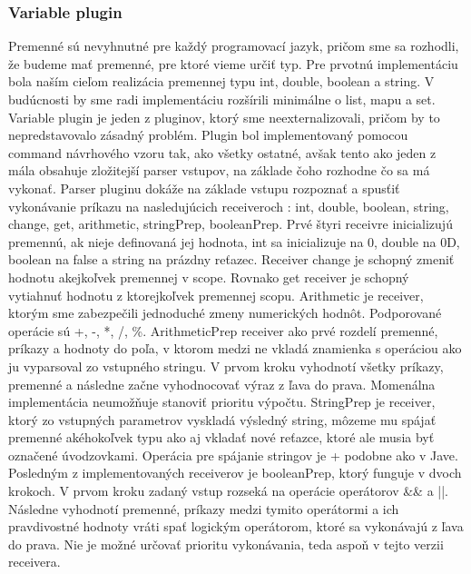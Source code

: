 \subsubsection{Variable plugin}
\indent Premenné sú nevyhnutné pre každý programovací jazyk, pričom sme sa rozhodli, že budeme mať premenné, pre ktoré vieme určiť typ. Pre prvotnú implementáciu bola naším cieľom realizácia premennej typu int, double, boolean a string. V budúcnosti by sme radi implementáciu rozšírili minimálne o list, mapu a set. Variable plugin je jeden z pluginov, ktorý sme neexternalizovali, pričom by to nepredstavovalo zásadný problém. Plugin bol implementovaný pomocou command návrhového vzoru tak, ako všetky ostatné, avšak tento ako jeden z mála obsahuje zložitejší parser vstupov, na základe čoho rozhodne čo sa má vykonať. 
\newline 
\indent Parser pluginu dokáže na základe vstupu rozpoznať a spusťiť vykonávanie príkazu na nasledujúcich receiveroch : int, double, boolean, string, change, get, arithmetic, stringPrep, booleanPrep. 
\newline 
\indent Prvé štyri receivre inicializujú premennú, ak nieje definovaná jej hodnota, int sa inicializuje na 0, double na 0D, boolean na false a string na prázdny reťazec. 
\newline 
\indent Receiver change je schopný zmeniť hodnotu akejkoľvek premennej v scope. Rovnako get receiver je schopný vytiahnuť hodnotu z ktorejkoľvek premennej scopu. 
\newline 
\indent Arithmetic je receiver, ktorým sme zabezpečili jednoduché zmeny numerických hodnôt. Podporované operácie sú +, -, *, /, \%. ArithmeticPrep receiver ako prvé rozdelí premenné, príkazy a hodnoty do poľa, v ktorom medzi ne vkladá znamienka s operáciou ako ju vyparsoval zo vstupného stringu. V prvom kroku vyhodnotí všetky príkazy, premenné a následne začne vyhodnocovať výraz z ľava do prava. Momenálna implementácia neumožňuje stanoviť prioritu výpočtu. 
\newline 
\indent StringPrep je receiver, ktorý zo vstupných parametrov vyskladá výsledný string, môzeme mu spájať premenné akéhokoľvek typu ako aj vkladať nové reťazce, ktoré ale musia byť označené úvodzovkami. Operácia pre spájanie stringov je + podobne ako v Jave. 
\newline 
\indent Posledným z implementovaných receiverov je booleanPrep, ktorý funguje v dvoch krokoch. V prvom kroku zadaný vstup rozseká na operácie operátorov \&\& a ||. Následne vyhodnotí premenné, príkazy medzi tymito operátormi a ich pravdivostné hodnoty vráti spať logickým operátorom, ktoré sa vykonávajú z ľava do prava. Nie je možné určovať prioritu vykonávania, teda aspoň v tejto verzii receivera.
